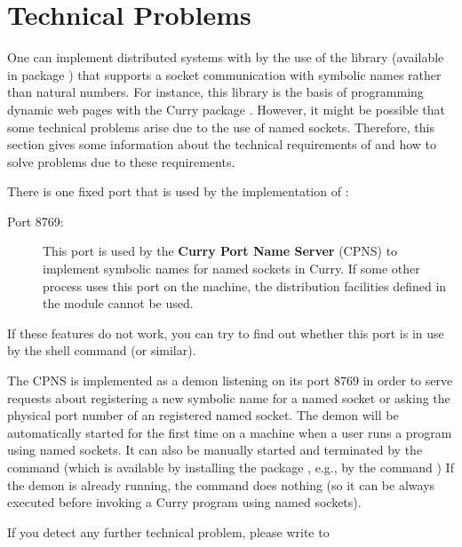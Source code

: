 \section{Technical Problems}

One can implement distributed systems with \CYS
by the use of the library 
(available in package )
that supports a socket communication with symbolic names
rather than natural numbers.
For instance, this library is the basis of programming
dynamic web pages with the Curry package .
However, it might be possible that some technical problems
arise due to the use of named sockets.
Therefore, this section gives some information
about the technical requirements of \CYS and how to solve
problems due to these requirements.

There is one fixed port that is used by the implementation of \CYS:
\begin{description}
\item[Port 8769:] This port is used by the
{\bf Curry Port Name Server} (CPNS) to implement symbolic names for
named sockets in Curry.
If some other process uses this port on the machine,
the distribution facilities defined in the module 
cannot be used.
\end{description}
If these features do not work, you can try to find out
whether this port is in use by the shell command
 (or similar).

The CPNS is implemented as a demon listening on its port 8769
in order to serve requests about registering a new symbolic
name for a named socket or asking the physical port number
of an registered named socket. The demon will be automatically started for
the first time on a machine when a user runs a program
using named sockets.
It can also be manually started and terminated by the
command  (which is available by installing
the package , e.g., by the command )
If the demon is already running,
the command 
does nothing (so it can be always executed
before invoking a Curry program using named sockets).

If you detect any further technical problem,
please write to
\begin{center}
\end{center}

